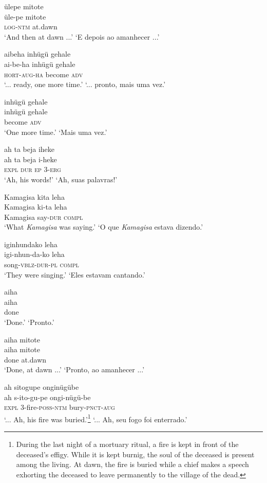 \documentclass[output=paper,
modfonts,nonflat
]{langsci/langscibook}
\begin{document}
\ea  ülepe mitote\\[.3em]
\gll üle-pe mitote\\
     \textsc{log}-\textsc{ntm} at.dawn\\
\glt ‘And then at dawn ...’
\glt ‘E depois ao amanhecer ...’
\z

\ea  aibeha inhügü gehale\\[.3em]
\gll ai-be-ha inhügü gehale\\
     \textsc{hort}-\textsc{aug}-\textsc{ha} become \textsc{adv}\\
\glt ‘... ready, one more time.’
\glt ‘... pronto, mais uma vez.’
\z

\ea  inhügü gehale\\[.3em]
\gll inhügü gehale\\
     become \textsc{adv}\\
\glt ‘One more time.’
\glt ‘Mais uma vez.’
\z

\ea  ah ta beja iheke\\[.3em]
\gll ah ta beja i-heke\\
     \textsc{expl} \textsc{dur} \textsc{ep} 3-\textsc{erg}\\
\glt ‘Ah, his words!’
\glt ‘Ah, suas palavras!’
\z

\ea  Kamagisa kita leha\\[.3em]
\gll Kamagisa ki-ta leha\\
     Kamagisa say-\textsc{dur} \textsc{compl}\\
\glt ‘What \textit{Kamagisa} was saying.’
\glt ‘O que \textit{Kamagisa} estava dizendo.’
\z

\ea  iginhundako leha\\[.3em]
\gll igi-nhun-da-ko leha\\
     song-\textsc{vblz}-\textsc{dur}-\textsc{pl} \textsc{compl}\\
\glt ‘They were singing.’
\glt ‘Eles estavam cantando.’
\z

\ea  aiha\\[.3em]
\gll aiha\\
     done\\
\glt ‘Done.’
\glt ‘Pronto.’
\z

\ea  aiha mitote\\[.3em]
\gll aiha mitote\\
     done at.dawn\\
\glt ‘Done, at dawn ...’
\glt ‘Pronto, ao amanhecer ...’
\z

\ea  ah sitogupe onginügübe\\[.3em]
\gll ah s-ito-gu-pe ongi-nügü-be\\
     \textsc{expl} 3-fire-\textsc{poss}-\textsc{ntm} bury-\textsc{pnct}-\textsc{aug}\\
\glt ‘... Ah, his fire was buried.’\footnote{During the last night of a mortuary ritual, a fire is kept in front of the deceased's effigy. While it is kept burnig, the soul of the deceased is present among the living. At dawn, the fire is buried while a chief makes a speech exhorting the deceased to leave permanently to the village of the dead.}
\glt ‘... Ah, seu fogo foi enterrado.’
\z
\end{document}
